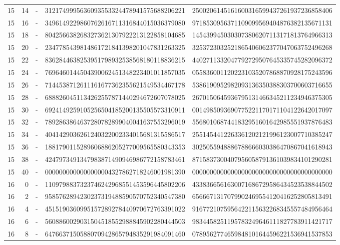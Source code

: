 \begin{longtable}{rrrll}
15 & 14 & - & 3121749995636093553324478941575688206221 & 2500206145161600316599437261937236858406 \\
15 & 16 & - & 3496149229860762616711316844015036379080 & 9718530956371109099569404876382135671131 \\
15 & 18 & - & 8042566382683273621307922213122858104685 & 1454399450303073806207113171813764966313 \\
15 & 20 & - & 2347785439814861721841398201047831263325 & 3253723032521865406062377047063752496268 \\
15 & 22 & - & 8362844638253951798932538568180118836215 & 4402711332047792729507645335745282096372 \\
15 & 24 & - & 7696460144504390062451348223401011857035 & 0558360011202231035207868870928175243596 \\
15 & 26 & - & 7144538712611161677362355621549534467178 & 5386190952982093136350388303700603716655 \\
15 & 28 & - & 6888260451134262557871440294672607078025 & 2670150645936795131466345211234946375305 \\
15 & 30 & - & 6924149259105256504185200135505573310911 & 0014985093690775221170171104122642017097 \\
15 & 32 & - & 7892863864637280782899040041637553296019 & 5568010687441832951601642985551937876483 \\
15 & 34 & - & 4041429036261240322002334015681315586517 & 2551454412263361202121996123007710385247 \\
15 & 36 & - & 1881790115289606886205277009565580343353 & 3025055948886788666030386470867041618943 \\
15 & 38 & - & 4247973491347983871490946986772158783461 & 8715837300407956058791361039834101290281 \\
15 & 40 & - & 0000000000000000004327862718246001981390 & 0000000000000000000000000000000000000000 \\
16 & 0 & - & 1109798837323746242968551453596445802206 & 4338366561630071686729586434523538844502 \\
16 & 2 & - & 9585762894230237319488590570752340547380 & 6566671317079902469554120416252805813491 \\
16 & 4 & - & 4515190360995157289278440970672763391022 & 9167721075956422115632268345557484956464 \\
16 & 6 & - & 5608860029031504518552988845902280444503 & 9834458251195783249646111827783911421717 \\
16 & 8 & - & 6476637150588070942865794835291984091460 & 0789562774659848101644596221536941537853 \\

\end{longtable}

